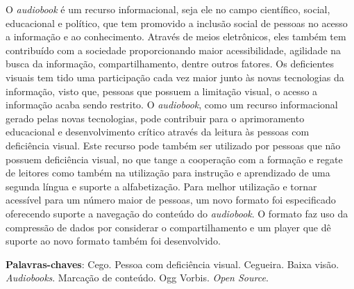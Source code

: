 \begin{resumo}


O \textit{audiobook} é um recurso informacional, seja ele no campo científico, social, educacional e político, que tem promovido a inclusão social de pessoas no acesso a informação e ao conhecimento. Através de meios eletrônicos, eles também tem contribuído com a sociedade proporcionando maior acessibilidade, agilidade na busca da informação, compartilhamento, dentre outros fatores. Os deficientes visuais tem tido uma participação cada vez maior junto às novas tecnologias da informação, visto que, pessoas que possuem a limitação visual, o acesso a informação acaba sendo restrito. O \textit{audiobook}, como um recurso informacional gerado pelas novas tecnologias, pode contribuir para o aprimoramento educacional e desenvolvimento crítico através da leitura às pessoas com deficiência visual. Este recurso pode também ser utilizado por pessoas que não possuem deficiência visual, no que tange a cooperação com a formação e regate de leitores como também na utilização para instrução e aprendizado de uma segunda língua e suporte a alfabetização. Para melhor utilização e tornar acessível para um número maior de pessoas, um novo formato foi especificado oferecendo suporte a navegação do conteúdo do \textit{audiobook}. O formato faz uso da compressão de dados por considerar o compartilhamento e um player que dê suporte ao novo formato também foi desenvolvido.

 \vspace{\onelineskip}
    
 \noindent
 \textbf{Palavras-chaves}: Cego. Pessoa com deficiência visual. Cegueira. Baixa visão. \textit{Audiobooks}. Marcação de conteúdo. Ogg Vorbis. \textit{Open Source}.
\end{resumo}
